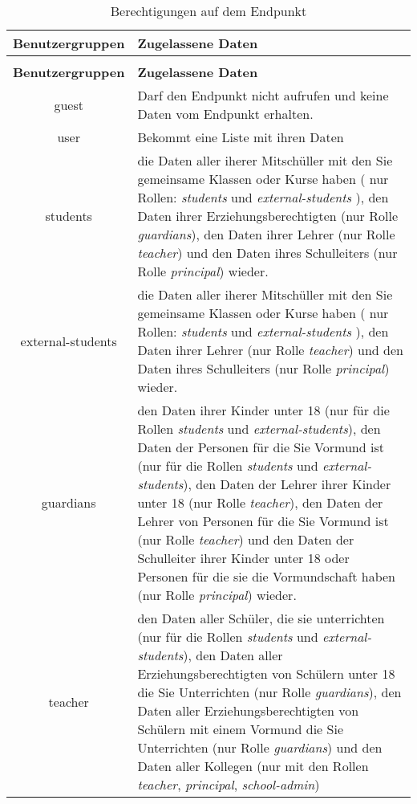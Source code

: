 \begin{longtable}{|c|p{}|}
\caption{Berechtigungen auf dem Endpunkt}
\label{tab:end:rest:api:school:users:read:right} \\
\hline
\textbf{Benutzergruppen} & \textbf{Zugelassene Daten} \\ \hline
\endfirsthead
\caption{Berechtigungen auf dem Endpunkt}\\
\hline
\textbf{Benutzergruppen} & \textbf{Zugelassene Daten} \\ \hline
\endhead
guest & Darf den Endpunkt nicht aufrufen und keine Daten vom Endpunkt erhalten. \\ \hline
user & Bekommt eine Liste mit ihren Daten \\ \hline 
students & die Daten aller iherer Mitschüller mit den Sie gemeinsame Klassen oder Kurse haben ( nur Rollen: \textit{students} und \textit{external-students} ),
           den Daten ihrer Erziehungsberechtigten (nur Rolle \textit{guardians}), 
					 den Daten ihrer Lehrer (nur Rolle \textit{teacher}) und 
					 den Daten ihres Schulleiters (nur Rolle \textit{principal}) wieder.\\ \hline
external-students &  die Daten aller iherer Mitschüller mit den Sie gemeinsame Klassen oder Kurse haben ( nur Rollen: \textit{students} und \textit{external-students} ),
           den Daten ihrer Lehrer (nur Rolle \textit{teacher}) und 
					 den Daten ihres Schulleiters (nur Rolle \textit{principal}) wieder.\\ \hline
guardians & den Daten ihrer Kinder unter 18 (nur für die Rollen \textit{students} und \textit{external-students}), 
					den Daten der Personen für die Sie Vormund ist (nur für die Rollen \textit{students} und \textit{external-students}), 
					den Daten der Lehrer ihrer Kinder unter 18 (nur Rolle \textit{teacher}),
					den Daten der Lehrer von Personen für die Sie Vormund ist (nur Rolle \textit{teacher})	und
					den Daten der Schulleiter ihrer Kinder unter 18 oder Personen für die sie die Vormundschaft haben (nur Rolle \textit{principal})
					wieder.\\ \hline
teacher & den Daten aller Schüler, die sie unterrichten (nur für die Rollen \textit{students} und \textit{external-students}),
					den Daten aller Erziehungsberechtigten von Schülern unter 18 die Sie Unterrichten (nur Rolle \textit{guardians}),
					den Daten aller Erziehungsberechtigten von Schülern mit einem Vormund die Sie Unterrichten (nur Rolle \textit{guardians}) und
					den Daten aller Kollegen (nur mit den Rollen \textit{teacher}, \textit{principal}, \textit{school-admin}) 

\end{longtable}
